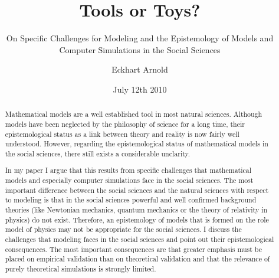 \documentclass[onecollarge]{STJour}
\numberwithin{equation}{section}
\begin{document}
 

%
\title{Tools or Toys?}
\subtitle{On Specific Challenges for Modeling and the
Epistemology of Models and Computer Simulations in the Social
Sciences\\[0.2cm]
}

%
%
\author{Eckhart Arnold}
%
%
%
\date{July 12th 2010}
 
\maketitle

\begin{abstract}
\onehalfspacing
Mathematical models are a well established tool in most 
natural sciences. Although models have been neglected by the
philosophy of science for a long time, their epistemological status as a
link between theory and reality is now fairly well understood.
However, regarding the epistemological status of mathematical models
in the social sciences, there still exists a considerable unclarity.

In my paper I argue that this results from specific challenges that
mathematical models and especially computer simulations face in the
social sciences. The most important difference between the social
sciences and the natural sciences with respect to modeling is that in
the social sciences powerful and well confirmed background theories (like
Newtonian mechanics, quantum mechanics or the theory of relativity in
physics) do not exist. Therefore, an epistemology
of models that is formed on the role model of physics may not be
appropriate for the social sciences. I discuss the challenges that
modeling faces in the social sciences and point out their epistemological
consequences. The most important consequences are that greater emphasis
must be placed on empirical validation than on theoretical validation and
that the relevance of purely theoretical simulations is strongly limited.

\end{abstract}
\end{document}
